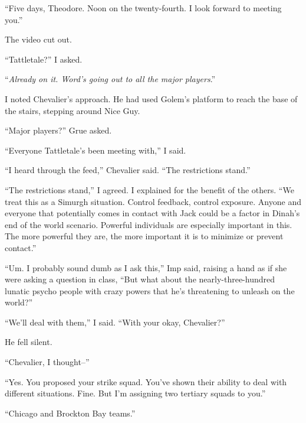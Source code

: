 ``Five days, Theodore.  Noon on the twenty-fourth.  I look forward to meeting you.''



The video cut out.



``Tattletale?'' I asked.



``\emph{Already on it.  Word's going out to all the major players}.''



I noted Chevalier's approach.  He had used Golem's platform to reach the base of the stairs, stepping around Nice Guy.



``Major players?'' Grue asked.



``Everyone Tattletale's been meeting with,'' I said.



``I heard through the feed,'' Chevalier said.  ``The restrictions stand.''



``The restrictions stand,'' I agreed.  I explained for the benefit of the others.  ``We treat this as a Simurgh situation.  Control feedback, control exposure.  Anyone and everyone that potentially comes in contact with Jack could be a factor in Dinah's end of the world scenario.  Powerful individuals are especially important in this.  The more powerful they are, the more important it is to minimize or prevent contact.''



``Um.  I probably sound dumb as I ask this,'' Imp said, raising a hand as if she were asking a question in class, ``But what about the nearly-three-hundred lunatic psycho people with crazy powers that he's threatening to unleash on the world?''



``We'll deal with them,'' I said.  ``With your okay, Chevalier?''



He fell silent.



``Chevalier, I thought--''



``Yes.  You proposed your strike squad. You've shown their ability to deal with different situations.  Fine.  But I'm assigning two tertiary squads to you.''



``Chicago and Brockton Bay teams.''



